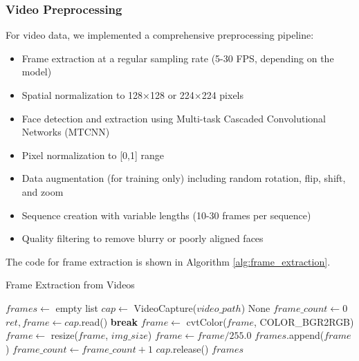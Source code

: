 \documentclass[conference,compsoc]{IEEEtran}
\begin{document}
\subsubsection{Video Preprocessing}
For video data, we implemented a comprehensive preprocessing pipeline:
\begin{itemize}
    \item Frame extraction at a regular sampling rate (5-30 FPS, depending on the model)
    \item Spatial normalization to 128×128 or 224×224 pixels
    \item Face detection and extraction using Multi-task Cascaded Convolutional Networks (MTCNN)
    \item Pixel normalization to [0,1] range
    \item Data augmentation (for training only) including random rotation, flip, shift, and zoom
    \item Sequence creation with variable lengths (10-30 frames per sequence)
    \item Quality filtering to remove blurry or poorly aligned faces
\end{itemize}

The code for frame extraction is shown in Algorithm \ref{alg:frame_extraction}.

\begin{algorithm}
\caption{Frame Extraction from Videos}
\label{alg:frame_extraction}
\begin{algorithmic}[1]
    \State $frames \gets$ empty list
    \State $cap \gets$ VideoCapture($video\_path$)
        \State \Return None
    \EndIf
    \State $frame\_count \gets 0$
        \State $ret, frame \gets cap$.read()
            \State \textbf{break}
        \EndIf
            \State $frame \gets$ cvtColor($frame$, COLOR\_BGR2RGB)
            \State $frame \gets$ resize($frame$, $img\_size$)
            \State $frame \gets frame / 255.0$  
            \State $frames$.append($frame$)
        \EndIf
        \State $frame\_count \gets frame\_count + 1$
    \EndWhile
    \State $cap$.release()
    \State \Return $frames$
\EndFunction
\end{algorithmic}
\end{algorithm}
\end{document}

